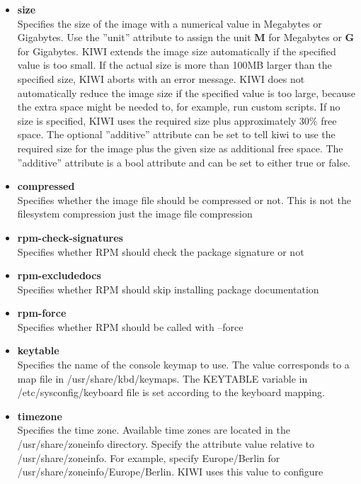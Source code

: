 \begin{itemize}
\item \textbf{size}\\
      Specifies the size of the image with a numerical value in
      Megabytes or Gigabytes. Use the ''unit'' attribute to assign the
      unit \textbf{M} for Megabytes or \textbf{G} for Gigabytes.
      KIWI extends the image size automatically if the specified value
      is too small. If the actual size is more than 100MB larger than
      the specified size, KIWI aborts with an error
      message. KIWI does not automatically reduce the image size if
      the specified value is too large, because the extra space might
      be needed to, for example, run custom scripts. If no size is
      specified, KIWI uses the required size plus approximately
      30\% free space. The optional ''additive'' attribute can be set
      to tell kiwi to use the required size for the image plus the
      given size as additional free space. The ''additive'' attribute is
      a bool attribute and can be set to either true or false.
\item \textbf{compressed}\\
      Specifies whether the image file should be compressed or not.
      This is not the filesystem compression just the image file compression
\item \textbf{rpm-check-signatures}\\
      Specifies whether RPM should check the package signature or not
\item \textbf{rpm-excludedocs}\\
      Specifies whether RPM should skip installing package documentation
\item \textbf{rpm-force}\\
      Specifies whether RPM should be called with --force
\item \textbf{keytable}\\
      Specifies the name of the console keymap to use. The value corresponds
      to a map file in /usr/share/kbd/keymaps. The KEYTABLE variable in
      /etc/sysconfig/keyboard file is set according to the keyboard
      mapping.
\item \textbf{timezone}\\
      Specifies the time zone. Available time zones are located in the
      /usr/share/zoneinfo directory. Specify the attribute value relative to
      /usr/share/zoneinfo. For example, specify Europe/Berlin for
      /usr/share/zoneinfo/Europe/Berlin. KIWI uses this value to configure

\end{itemize}
